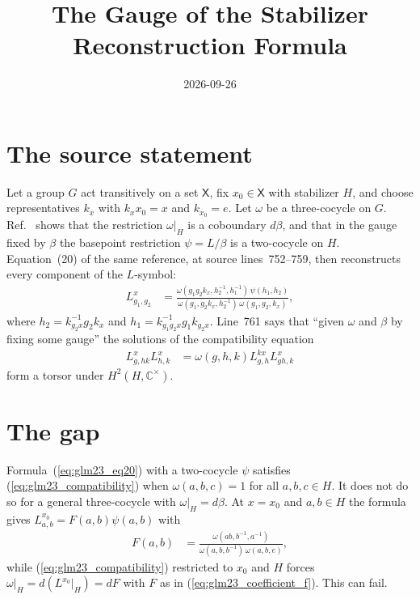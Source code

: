 \documentclass{article}
\title{The Gauge of the Stabilizer Reconstruction Formula}
\author{}
\date{2026-09-26}
\begin{document}
\maketitle
{}

\section{The source statement}

Let a group $G$ act transitively on a set $\mathsf X$, fix
$x_0\in\mathsf X$ with stabilizer $H$, and choose representatives $k_x$
with $k_xx_0=x$ and $k_{x_0}=e$. Let $\omega$ be a three-cocycle on $G$.
Ref.~\cite[source lines~740--747]{GarreRubio2023MPOSym} shows that the
restriction $\omega|_H$ is a coboundary $d\beta$, and that in the gauge fixed by $\beta$
the basepoint restriction $\psi=L/\beta$ is a
two-cocycle on $H$. Equation~(20) of the same reference, at source
lines~752--759, then reconstructs every component of the $L$-symbol:
\begin{align}
    L^x_{g_1,g_2}
        &=\frac{\omega(g_1g_2k_x,h_2^{-1},h_1^{-1})\,\psi(h_1,h_2)}
          {\omega(g_1,g_2k_x,h_2^{-1})\,\omega(g_1,g_2,k_x)},
    \label{eq:glm23_eq20}
\end{align}
where $h_2=k_{g_2x}^{-1}g_2k_x$ and $h_1=k_{g_1g_2x}^{-1}g_1k_{g_2x}$.
Line~761 says that ``given $\omega$ and $\beta$ by fixing some gauge'' the
solutions of the compatibility equation
\begin{align}
    L^x_{g,hk}L^x_{h,k}
        &=\omega(g,h,k)L^{kx}_{g,h}L^x_{gh,k}
    \label{eq:glm23_compatibility}
\end{align}
form a torsor under $H^2(H,\mathbb C^\times)$.

\section{The gap}

Formula~(\ref{eq:glm23_eq20}) with a two-cocycle $\psi$ satisfies
(\ref{eq:glm23_compatibility}) when $\omega(a,b,c)=1$ for all
$a,b,c\in H$. It does not do so for a general three-cocycle with
$\omega|_H=d\beta$. At $x=x_0$ and $a,b\in H$ the formula gives
$L^{x_0}_{a,b}=F(a,b)\psi(a,b)$ with
\begin{align}
    F(a,b)
        &=\frac{\omega(ab,b^{-1},a^{-1})}{\omega(a,b,b^{-1})\,\omega(a,b,e)},
    \label{eq:glm23_coefficient_f}
\end{align}
while (\ref{eq:glm23_compatibility}) restricted to $x_0$ and $H$ forces
$\omega|_H=d(L^{x_0}|_H)=dF$ with $F$ as in (\ref{eq:glm23_coefficient_f}). This can fail.
\end{document}
